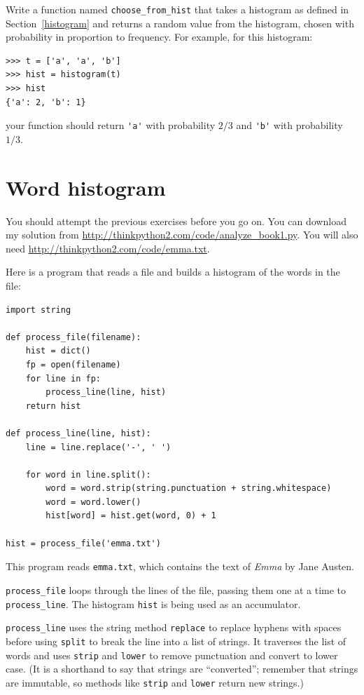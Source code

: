 \documentclass[10pt]{book}
\begin{document}
\begin{exercise}

Write a function named \verb"choose_from_hist" that takes
a histogram as defined in Section~\ref{histogram} and returns a 
random value from the histogram, chosen with probability
in proportion to frequency.  For example, for this histogram:

\begin{verbatim}
>>> t = ['a', 'a', 'b']
>>> hist = histogram(t)
>>> hist
{'a': 2, 'b': 1}
\end{verbatim}
%
your function should return \verb"'a'" with probability $2/3$ and \verb"'b'"
with probability $1/3$.
\end{exercise}


\section{Word histogram}

You should attempt the previous exercises before you go on.
You can download my solution from
 \url{http://thinkpython2.com/code/analyze_book1.py}.  You will
also need \url{http://thinkpython2.com/code/emma.txt}.

Here is a program that reads a file and builds a histogram of the
words in the file:

\begin{verbatim}
import string

def process_file(filename):
    hist = dict()
    fp = open(filename)
    for line in fp:
        process_line(line, hist)
    return hist

def process_line(line, hist):
    line = line.replace('-', ' ')
    
    for word in line.split():
        word = word.strip(string.punctuation + string.whitespace)
        word = word.lower()
        hist[word] = hist.get(word, 0) + 1

hist = process_file('emma.txt')
\end{verbatim}
%
This program reads {\tt emma.txt}, which contains the text of {\em
  Emma} by Jane Austen.

\verb"process_file" loops through the lines of the file,
passing them one at a time to \verb"process_line".  The histogram
{\tt hist} is being used as an accumulator.

\verb"process_line" uses the string method {\tt replace} to replace
hyphens with spaces before using {\tt split} to break the line into a
list of strings.  It traverses the list of words and uses {\tt strip}
and {\tt lower} to remove punctuation and convert to lower case.  (It
is a shorthand to say that strings are ``converted''; remember that
strings are immutable, so methods like {\tt strip} and {\tt lower}
return new strings.)
\end{document}
